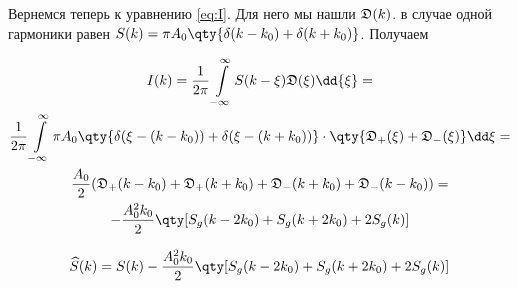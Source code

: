\documentclass[a4paper,14pt]{extarticle}
\begin{document}


Вернемся теперь к уравнению \eqref{eq:I}. 
Для него мы нашли $\mathfrak{D}(k)$.
в случае одной гармоники равен  $S(k) = \pi A_0 \qty{\delta(k-k_{0}) +
\delta(k+k_{0})}$.
Получаем

\begin{gather}
    I(k) = \frac{1}{2\pi} \int\limits_{-\infty}^{\infty}  S(k-\xi)
    \D(\xi)\dd{\xi} = \\
    \frac{1}{2\pi} \int\limits_{-\infty}^{\infty} \pi A_{0}\qty{
    \delta(\xi- (k-k_{0}) ) + \delta(\xi - (k+k_{0})) } 
    \cdot \qty{\D_{+}(\xi) + \D_{-}(\xi)} \dd \xi = \\
    \frac{A_{0}}{2} (
    \D_{+}(k-k_{0}) +
    \D_{+}(k+k_{0}) +
    \D_{-}(k+k_{0}) +
    \D_{-}(k-k_{0}) 
    ) = \\
    -\frac{A_{0}^2 k_{0}}{2} \qty[
    S_g(k-2k_{0}) +
    S_g(k+2k_{0}) +
    2S_g(k)
    ]
\end{gather}

\begin{equation}
    \label{eq:}
    \widehat S(k) = S(k)  
    -\frac{A_{0}^2 k_{0}}{2} \qty[
    S_g(k-2k_{0}) +
    S_g(k+2k_{0}) +
    2S_g(k)
    ]
\end{equation}
\end{document}
